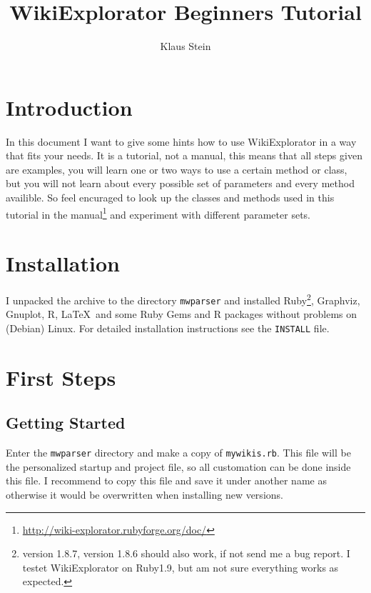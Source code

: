 \documentclass[a4paper]{scrartcl}
\title{WikiExplorator Beginners Tutorial}
\author{Klaus Stein}
\newcounter{tcounter}
\newcommand{\file}[1]{\texttt{\color{file}#1}}
\newcounter{fntrdoc}
\begin{document}
\maketitle
\clearpage
\tableofcontents
\clearpage

\section{Introduction}
\label{sec:intro}

In this document I want to give some hints how to use WikiExplorator
in a way that fits your needs. It is a tutorial, not a manual, this
means that all steps given are examples, you will learn one or two
ways to use a certain method or class, but you will not learn about
every possible set of parameters and every method availible. So feel
encuraged to look up the classes and methods used in this tutorial in the
manual\footnote{\url{http://wiki-explorator.rubyforge.org/doc/}}%
\setcounter{fntrdoc}{\thefootnote} and experiment with different
parameter sets.

\section{Installation}
\label{sec:install}

I unpacked the archive to the directory \file{mwparser} and installed
Ruby\footnote{version 1.8.7, version 1.8.6 should also work, if not
  send me a bug report. I testet WikiExplorator on Ruby1.9, but am not
  sure everything works as expected.}, Graphviz, Gnuplot, R, \LaTeX\ and
some Ruby Gems and R packages without problems on (Debian) Linux. For
detailed installation instructions see the \file{INSTALL} file. 

\section{First Steps}
\label{sec:first}

\subsection{Getting Started}
\label{sec:start}

Enter the \file{mwparser} directory and make a copy of
\file{mywikis.rb}. This file will be the personalized startup and
project file, so all customation can be done inside this file. I
recommend to copy this file and save it under another name as
otherwise it would be overwritten when installing new versions.
\end{document}
